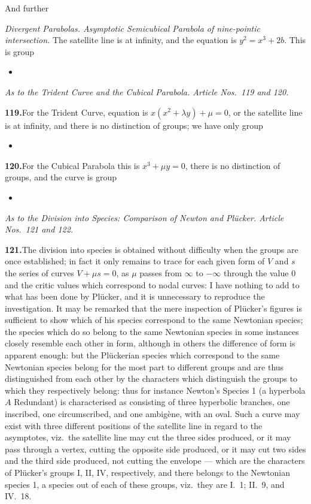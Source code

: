 \documentclass[11pt]{article}
\begin{document}
And further
\smallskip

\noindent\emph{Divergent Parabolas. Asymptotic Semicubical Parabola of nine-pointic intersection.} The satellite line is at infinity, and the equation is $y^{2} = x^{3} + 2 b$. This is group
\begin{itemize}\itemsep0pt
\item[LIX.]
\end{itemize}

\bigskip
\noindent\textit{As to the Trident Curve and the Cubical Parabola. Article Nos.~119 and 120.}

\medskip
\textbf{119.}\quad For the Trident Curve, equation is $x(x^{2} + \lambda y) + \mu = 0$, or the satellite line is at infinity, and there is no distinction of groups; we have only group
\begin{itemize}\itemsep0pt
\item[LX.]
\end{itemize}

\medskip
\textbf{120.}\quad For the Cubical Parabola this is $x^{3} + \mu y = 0$, there is no distinction of groups, and the curve is group
\begin{itemize}\itemsep0pt
\item[LXI.]
\end{itemize}

\bigskip
\noindent\textit{As to the Division into Species: Comparison of Newton and Pl\"ucker. Article Nos.~121 and 122.}

\medskip
\textbf{121.}\quad The division into species is obtained without difficulty when the groups are once established; in fact it only remains to trace for each given form of $V$ and $s$ the series of curves $V + \mu s = 0$, as $\mu$ passes from $\infty$ to $-\infty$ through the value $0$ and the critic values which correspond to nodal curves: I have nothing to add to what has been done by Pl\"ucker, and it is unnecessary to reproduce the investigation. It may be remarked that the mere inspection of Pl\"ucker's figures is sufficient to show which of his species correspond to the same Newtonian species; the species which do so belong to the same Newtonian species in some instances closely resemble each other in form, although in others the difference of form is apparent enough: but the Pl\"uckerian species which correspond to the same Newtonian species belong for the most part to different groups and are thus distinguished from each other by the characters which distinguish the groups to which they respectively belong: thus for instance Newton's Species 1 (a hyperbola $A$ Redundant) is characterised as consisting of three hyperbolic branches, one inscribed, one circumscribed, and one ambig\`ene, with an oval. Such a curve may exist with three different positions of the satellite line in regard to the asymptotes, viz.\ the satellite line may cut the three sides produced, or it may pass through a vertex, cutting the opposite side produced, or it may cut two sides and the third side produced, not cutting the envelope --- which are the characters of Pl\"ucker's groups I, II, IV, respectively, and there belongs to the Newtonian species 1, a species out of each of these groups, viz.\ they are I.\ 1; II.\ 9, and IV.\ 18.
\end{document}
